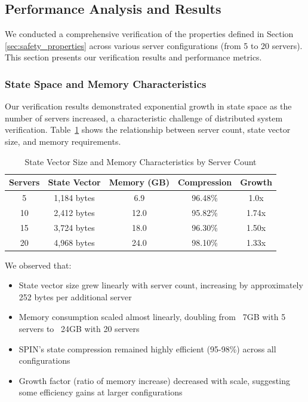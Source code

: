 \documentclass[a4paper]{llncs}
\renewcommand{\arraystretch}{0.85} %
\newcommand{\compacttable}[1]{%
  \begingroup
  \scriptsize
  \setlength{\tabcolsep}{2.5pt}%
  \renewcommand{\arraystretch}{0.8}%
  #1%
  \endgroup
}
\begin{document}
\subsection{Performance Analysis and Results}
\label{sec:performance_analysis}

We conducted a comprehensive verification of the properties defined in Section \ref{sec:safety_properties} across various server configurations (from 5 to 20 servers). This section presents our verification results and performance metrics.

\subsubsection{State Space and Memory Characteristics}
\label{sec:state_space}

Our verification results demonstrated exponential growth in state space as the number of servers increased, a characteristic challenge of distributed system verification. Table~\ref{tab:state-vector} shows the relationship between server count, state vector size, and memory requirements.

\begin{table}[!htbp]
\centering
\caption{State Vector Size and Memory Characteristics by Server Count}
\label{tab:state-vector}
\compacttable{
\begin{tabular}{|c|c|c|c|c|}
\hline
\textbf{Servers} & \textbf{State Vector} & \textbf{Memory (GB)} & \textbf{Compression} & \textbf{Growth} \\
\hline
5 & 1,184 bytes & 6.9 & 96.48\% & 1.0x \\
\hline
10 & 2,412 bytes & 12.0 & 95.82\% & 1.74x \\
\hline
15 & 3,724 bytes & 18.0 & 96.30\% & 1.50x \\
\hline
20 & 4,968 bytes & 24.0 & 98.10\% & 1.33x \\
\hline
\end{tabular}
}
\end{table}

We observed that:
\begin{itemize}
    \item State vector size grew linearly with server count, increasing by approximately 252 bytes per additional server
    \item Memory consumption scaled almost linearly, doubling from ~7GB with 5 servers to ~24GB with 20 servers
    \item SPIN's state compression remained highly efficient (95-98\%) across all configurations
    \item Growth factor (ratio of memory increase) decreased with scale, suggesting some efficiency gains at larger configurations
\end{itemize}
\end{document}
